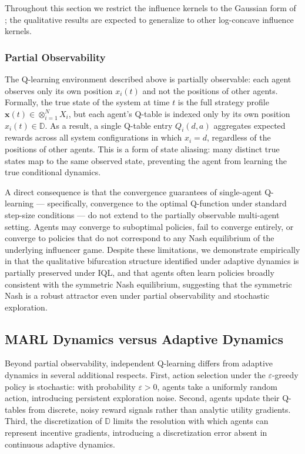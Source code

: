 \documentclass{article}
\begin{document}
            Throughout this section we restrict the influence kernels to the Gaussian form of ; the qualitative results are expected to generalize to other log-concave influence kernels.

        \subsubsection{Partial Observability}\label{subsubsec:SI_partial_obs}

            The Q-learning environment described above is partially observable: each agent observes only its own position $x_i(t)$ and not the positions of other agents. Formally, the true state of the system at time $t$ is the full strategy profile $\mathbf{x}(t) \in \otimes_{i=1}^N X_i$, but each agent's Q-table is indexed only by its own position $x_i(t) \in \mathbb{D}$. As a result, a single Q-table entry $Q_i(d, a)$ aggregates expected rewards across all system configurations in which $x_i = d$, regardless of the positions of other agents. This is a form of state aliasing: many distinct true states map to the same observed state, preventing the agent from learning the true conditional dynamics.

            A direct consequence is that the convergence guarantees of single-agent Q-learning --- specifically, convergence to the optimal Q-function under standard step-size conditions \cite{watkins1992q} --- do not extend to the partially observable multi-agent setting. Agents may converge to suboptimal policies, fail to converge entirely, or converge to policies that do not correspond to any Nash equilibrium of the underlying influencer game. Despite these limitations, we demonstrate empirically in  that the qualitative bifurcation structure identified under adaptive dynamics is partially preserved under IQL, and that agents often learn policies broadly consistent with the symmetric Nash equilibrium, suggesting that the symmetric Nash is a robust attractor even under partial observability and stochastic exploration.

        \subsection{MARL Dynamics versus Adaptive Dynamics}\label{subsec:SI_marl_vs_ad}

            Beyond partial observability, independent Q-learning differs from adaptive dynamics in several additional respects. First, action selection under the $\varepsilon$-greedy policy is stochastic: with probability $\varepsilon > 0$, agents take a uniformly random action, introducing persistent exploration noise. Second, agents update their Q-tables from discrete, noisy reward signals rather than analytic utility gradients. Third, the discretization of $\mathbb{D}$ limits the resolution with which agents can represent incentive gradients, introducing a discretization error absent in continuous adaptive dynamics.
\end{document}
